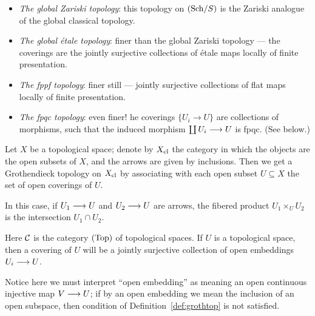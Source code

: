 \begin{2   CONTRAVARIANT FUNCTORS}
\begin{2.3 Sheaves in Grothendieck topologies}
\begin{shaded}
\begin{itemize}
A covering of $U \arr X$ is to be a jointly surjective collection of morphisms $U_i \arr U$.
 {\small (Note that any arrow $U \arr V$ over $X$ is necessarily \'etale!)}
\item 
\textit{The global Zariski topology}: this topology on $({\mathrm{Sch}/S})$ is the Zariski analogue of the global classical topology.
\item
\textit{The global \'etale topology}: finer than the global Zariski topology --- the coverings are the jointly surjective collections of \'etale maps locally of finite presentation.
\item \textit{The fppf topology}: finer still --- jointly surjective collections of flat maps locally of finite presentation.
\item \textit{The fpqc topology}: even finer! he coverings $\{U_i \to U\}$ are collections of morphisms, such that the induced morphism $\coprod U_i \arr U$ is fpqc. (See below.)
\end{itemize}

\end{shaded}

\begin{example}
\label{ex:classical-topology}%
%
Let $X$ be a topological space; denote by $X_\mathrm{cl}$ the category in which the objects are the open subsets of $X$, and the arrows are given by inclusions. Then we get a Grothendieck topology on $X_\mathrm{cl}$ by associating with each open subset $U \subseteq X$ the set of open coverings of $U$.

In this case, if $U_1 \arr U$ and $U_2 \arr U$ are arrows, the fibered product $U_1 \times_U U_2$ is the intersection $U_1 \cap U_2$.
\end{example}

\begin{example}\label{ex:global-classical}%
%
Here $\mathcal{C}$ is the category $(\mathrm{Top})$ of topological spaces. If $U$ is a topological space, then a covering of $U$ will be a jointly surjective collection of open embeddings $U_i \arr U$.

Notice here we must interpret ``open embedding'' as meaning an open continuous injective map $V \arr U$; if by an open embedding we mean the inclusion of an open subspace, then condition  of Definition~\ref{def:grothtop} is not satisfied.
\end{example}


\end{2.3 Sheaves in Grothendieck topologies}
\end{2   CONTRAVARIANT FUNCTORS}
